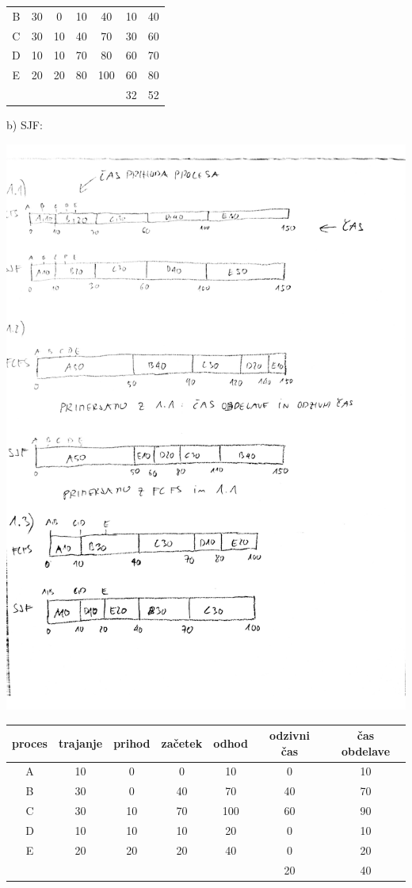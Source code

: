 {\begin{center}
\begin{tabular}{c|cc|cc|cc}
B & 30 &  0 & 10 & 40 & 10 & 40 \\
C & 30 & 10 & 40 & 70 & 30 & 60 \\
D & 10 & 10 & 70 & 80 & 60 & 70 \\
E & 20 & 20 & 80 & 100 & 60 & 80 \\
\hline
& & & & & 32 & 52
\end{tabular}
\end{center}
b) SJF:
\begin{center}
\includegraphics[width=.9\textwidth]{razvrscanje/1.3-SJF.pdf}\\
\begin{tabular}{c|cc|cc|cc}
proces & trajanje & prihod & začetek & odhod & odzivni čas & čas obdelave \\
\hline
A & 10 &  0 &   0 & 10 & 0 & 10 \\
B & 30 &  0 & 40 & 70 & 40 & 70  \\
C & 30 & 10 & 70 & 100 & 60 & 90 \\
D & 10 & 10 & 10 & 20 & 0 & 10 \\
E & 20 & 20 & 20 & 40 & 0 & 20 \\
\hline
& & & & & 20 & 40
\end{tabular}
\end{center}
}


